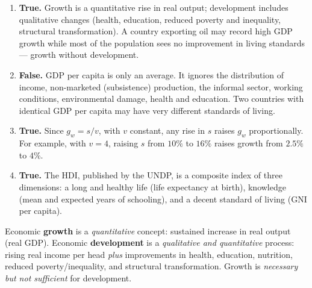\documentclass[11pt]{article}
\begin{document}
\begin{corrige}
\begin{enumerate}
\item \textbf{True.} Growth is a quantitative rise in real output; development includes qualitative changes (health, education, reduced poverty and inequality, structural transformation). A country exporting oil may record high GDP growth while most of the population sees no improvement in living standards — growth without development.
\item \textbf{False.} GDP per capita is only an average. It ignores the distribution of income, non-marketed (subsistence) production, the informal sector, working conditions, environmental damage, health and education. Two countries with identical GDP per capita may have very different standards of living.
\item \textbf{True.} Since $g_w = s/v$, with $v$ constant, any rise in $s$ raises $g_w$ proportionally. For example, with $v=4$, raising $s$ from $10\%$ to $16\%$ raises growth from $2.5\%$ to $4\%$.
\item \textbf{True.} The HDI, published by the UNDP, is a composite index of three dimensions: a long and healthy life (life expectancy at birth), knowledge (mean and expected years of schooling), and a decent standard of living (GNI per capita).
\end{enumerate}
\end{corrige}

\begin{aretenir}
Economic \textbf{growth} is a \emph{quantitative} concept: sustained increase in real output (real GDP). Economic \textbf{development} is a \emph{qualitative and quantitative} process: rising real income per head \emph{plus} improvements in health, education, nutrition, reduced poverty/inequality, and structural transformation. Growth is \emph{necessary but not sufficient} for development.
\end{aretenir}
\end{document}
